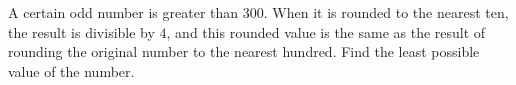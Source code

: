 A certain odd number is greater than $300$. When it is rounded to the nearest ten, the result is divisible by $4$, and this rounded value is the same as the result of rounding the original number to the nearest hundred. Find the least possible value of the number.
